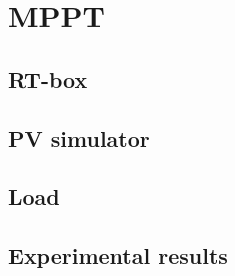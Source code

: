 \section{MPPT}

\subsection{RT-box}

\subsection{PV simulator}

\subsection{Load}

\subsection{Experimental results}